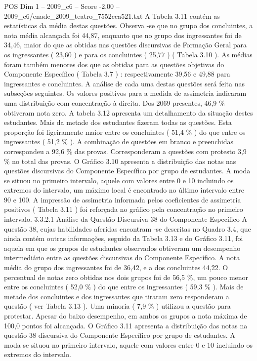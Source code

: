 \begin{textsample}{POS Dim 1 – 2009\_c6 – Score -2.00 – 2009\_c6/enade\_2009\_teatro\_7552cca521.txt}
A Tabela 3.11 contém as estatísticas da média destas questões.
Observa -se que no grupo dos concluintes, a nota média alcançada foi 44,87, enquanto que no grupo dos ingressantes foi de 34,46, maior do que as obtidas nas questões discursivas de Formação Geral para os ingressantes ( 23,60 ) e para os concluintes ( 25,77 ) ( Tabela 3.10 ).
As médias foram também menores dos que as obtidas para as questões objetivas do Componente Específico ( Tabela 3.7 ) : respectivamente 39,56 e 49,88 para ingressantes e concluintes.
A análise de cada uma destas questões será feita nas subseções seguintes.
Os valores positivos para a medida de assimetria indicaram uma distribuição com concentração à direita.
Dos 2069 presentes, 46,9 \% obtiveram nota zero.
A tabela 3.12 apresenta um detalhamento da situação destes estudantes.
Mais da metade dos estudantes fizeram todas as questões.
Esta proporção foi ligeiramente maior entre os concluintes ( 51,4 \% ) do que entre os ingressantes ( 51,2 \% ).
A combinação de questões em branco e preenchidas correspondeu a 92,6 \% das provas.
Corresponderam a questões com protesto 3,9 \% no total das provas.
O Gráfico 3.10 apresenta a distribuição das notas nas questões discursivas do Componente Específico por grupo de estudantes.
A moda se situou no primeiro intervalo, aquele com valores entre 0 e 10 incluindo os extremos do intervalo, um máximo local é encontrado no último intervalo entre 90 e 100.
A impressão de assimetria informada pelos coeficientes de assimetria positivos ( Tabela 3.11 ) foi reforçada no gráfico pela concentração no primeiro intervalo. 3.3.2.1 Análise da Questão Discursiva 38 do Componente Específico A questão 38, cujas habilidades aferidas encontram -se descritas no Quadro 3.4, que ainda contém outras informações, seguido da Tabela 3.13 e do Gráfico 3.11, foi aquela em que os grupos de estudantes observados obtiveram um desempenho intermediário entre as questões discursivas do Componente Específico.
A nota média do grupo dos ingressantes foi de 36,42, e a dos concluintes 44,22.
O percentual de notas zero obtidas nos dois grupos foi de 56,5 \%, um pouco menor entre os concluintes ( 52,0 \% ) do que entre os ingressantes ( 59,3 \% ).
Mais de metade dos concluintes e dos ingressantes que tiraram zero responderam a questão ( ver Tabela 3.13 ).
Uma minoria ( 7,9 \% ) utilizou a questão para protestar.
Apesar do baixo desempenho, em ambos os grupos a nota máxima de 100,0 pontos foi alcançada.
O Gráfico 3.11 apresenta a distribuição das notas na questão 38 discursiva do Componente Específico por grupo de estudantes.
A moda se situou no primeiro intervalo, aquele com valores entre 0 e 10 incluindo os extremos do intervalo.

\end{textsample}
